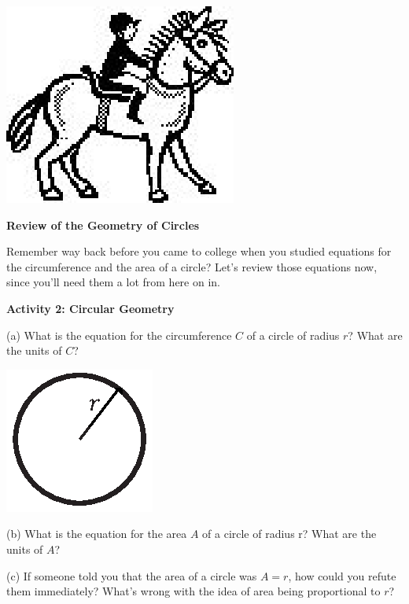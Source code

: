 \vspace{0.3cm}
{\par\raggedright \includegraphics{rotation/rotation_fig3.eps} \par}
\vspace{0.3cm}

\textbf{Review of the Geometry of Circles }

Remember way back before you came to college when you studied equations for
the circumference and the area of a circle? Let's review those equations now,
since you'll need them a lot from here on in.

\textbf{Activity 2: Circular Geometry} 

(a) What is the equation for the circumference $C$ of a circle of radius $r$?
What are the units of $C$?

\vspace{0.3cm}
{\par\raggedright \includegraphics{rotation/just_a_circle.eps} \par}
\answerspace{0.3cm}

(b) What is the equation for the area $A$ of a circle of radius r? What are
the units of $A$?
\answerspace{10mm}

(c) If someone told you that the area of a circle was $A = r$, how could you refute
them immediately? What's wrong with the idea of area being proportional to $r$?
\answerspace{20mm}

